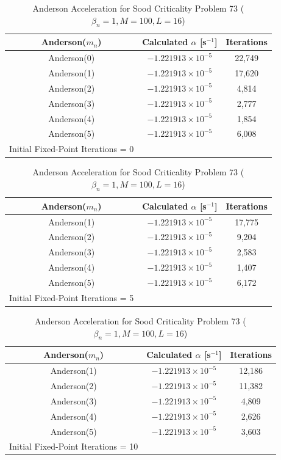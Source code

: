 \begin{table}[!htbp]
\caption{Anderson Acceleration for Sood Criticality Problem 73 ($\beta_{n} = 1, M = 100, L = 16$)}
	\label{table:Sood73AA}
	\begin{subtable}[h]{1.0\textwidth}
	\centering{}
	\begin{tabular}{@{}ccc@{}}\toprule
	Anderson($m_{n}$) & Calculated $\alpha$ [s$^{-1}$] & Iterations \\
	\midrule
	Anderson(0) & $-1.221913 \times 10^{-5}$ & 22,749 \\
	Anderson(1) & $-1.221913 \times 10^{-5}$ & 17,620 \\
	Anderson(2) & $-1.221913 \times 10^{-5}$ & 4,814  \\
	Anderson(3) & $-1.221913 \times 10^{-5}$ & 2,777  \\
	Anderson(4) & $-1.221913 \times 10^{-5}$ & 1,854  \\
	Anderson(5) & $-1.221913 \times 10^{-5}$ & 6,008  \\
	\bottomrule
	Initial Fixed-Point Iterations = 0
	\end{tabular}
	\end{subtable}%
	\vspace{0.25cm}
	\begin{subtable}[h]{1.0\textwidth}
	\centering{}
	\begin{tabular}{@{}ccc@{}}\toprule
	Anderson($m_{n}$) & Calculated $\alpha$ [s$^{-1}$] & Iterations \\
	\midrule
	Anderson(1) & $-1.221913 \times 10^{-5}$ & 17,775 \\
	Anderson(2) & $-1.221913 \times 10^{-5}$ & 9,204 \\
	Anderson(3) & $-1.221913 \times 10^{-5}$ & 2,583 \\
	Anderson(4) & $-1.221913 \times 10^{-5}$ & 1,407 \\
	Anderson(5) & $-1.221913 \times 10^{-5}$ & 6,172 \\
	\bottomrule
	Initial Fixed-Point Iterations = 5
	\end{tabular}
	\end{subtable}%
	\vspace{0.25cm}
	\begin{subtable}[h]{1.0\textwidth}
	\centering{}
	\begin{tabular}{@{}ccc@{}}\toprule
	Anderson($m_{n}$) & Calculated $\alpha$ [s$^{-1}$] & Iterations \\
	\midrule
	Anderson(1) & $-1.221913 \times 10^{-5}$ & 12,186 \\
	Anderson(2) & $-1.221913 \times 10^{-5}$ & 11,382 \\
	Anderson(3) & $-1.221913 \times 10^{-5}$ & 4,809 \\
	Anderson(4) & $-1.221913 \times 10^{-5}$ & 2,626 \\
	Anderson(5) & $-1.221913 \times 10^{-5}$ & 3,603 \\
	\bottomrule
	Initial Fixed-Point Iterations = 10
	\end{tabular}
	\end{subtable}
\end{table}

